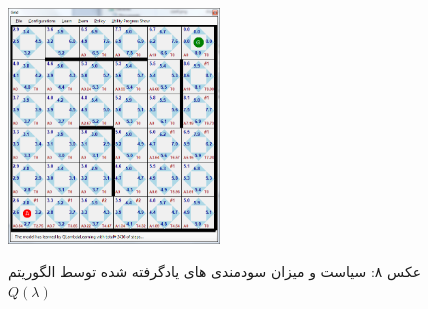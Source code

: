 \documentclass[10pt,a4paper]{article}
\begin{document}
\begin{figure}[H]
    \centering
    \includegraphics[width=0.5\textwidth]{qlambda}
    \begin{center}
    \textarabic{عکس ۸: سیاست و میزان سودمندی های یادگرفته شده توسط الگوریتم $Q(\lambda)$ }
    \end{center}
\end{figure}
\end{document}
